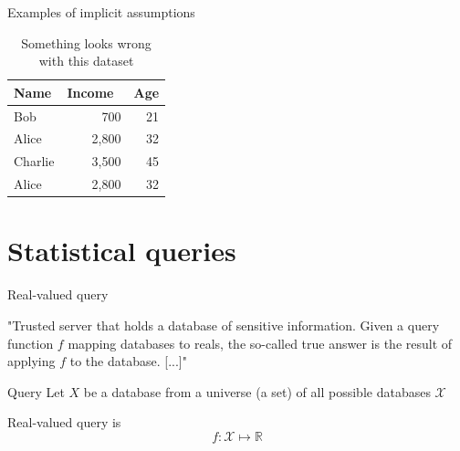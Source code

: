 \documentclass[12pt,aspectratio=169,handout]{beamer}
\begin{document}
\begin{frame}{Examples of implicit assumptions}


\begin{table}
\footnotesize
\begin{tabular}{lrr} \toprule
Name & Income & Age \\ \midrule
Bob & 700 & 21 \\
Alice & 2,800 & 32 \\
Charlie & 3,500 & 45 \\
Alice & 2,800 & 32 \\
\bottomrule
\end{tabular}
\caption{Something looks wrong with this dataset}
\end{table}

\end{frame}



\section{Statistical queries}


\begin{frame}{Real-valued query}

"Trusted server that holds a database of sensitive information. Given a query function $f$ mapping databases to reals, the so-called true answer is the result of applying $f$ to the database. [...]"

\begin{block}{Query}
Let $X$ be a database from a universe (a set) of all possible databases $\mathcal{X}$

Real-valued query is
$$
f: \mathcal{X} \mapsto \mathbb{R}
$$
\end{block}



\end{frame}
\end{document}
